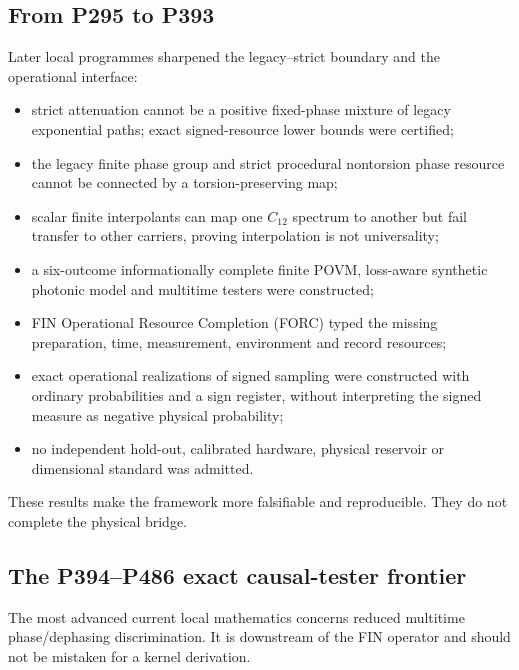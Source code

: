 \documentclass[11pt,a4paper]{article}
\theoremstyle{definition}
\theoremstyle{remark}
\begin{document}
\subsection{From P295 to P393}

Later local programmes sharpened the legacy--strict boundary and the operational interface:

\begin{itemize}
\item strict attenuation cannot be a positive fixed-phase mixture of legacy exponential paths; exact signed-resource lower bounds were certified;
\item the legacy finite phase group and strict procedural nontorsion phase resource cannot be connected by a torsion-preserving map;
\item scalar finite interpolants can map one $C_{12}$ spectrum to another but fail transfer to other carriers, proving interpolation is not universality;
\item a six-outcome informationally complete finite POVM, loss-aware synthetic photonic model and multitime testers were constructed;
\item FIN Operational Resource Completion (FORC) typed the missing preparation, time, measurement, environment and record resources;
\item exact operational realizations of signed sampling were constructed with ordinary probabilities and a sign register, without interpreting the signed measure as negative physical probability;
\item no independent hold-out, calibrated hardware, physical reservoir or dimensional standard was admitted.
\end{itemize}

These results make the framework more falsifiable and reproducible. They do not complete the physical bridge.

\subsection{The P394--P486 exact causal-tester frontier}

The most advanced current local mathematics concerns reduced multitime phase/dephasing discrimination. It is downstream of the FIN operator and should not be mistaken for a kernel derivation.
\end{document}
